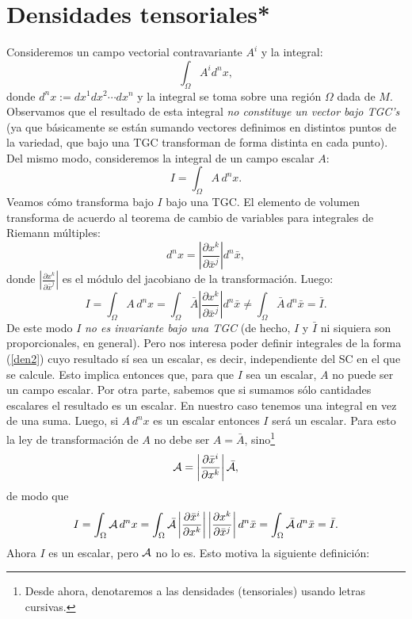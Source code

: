  \section{Densidades tensoriales*}

 Consideremos un campo vectorial contravariante $A^i $ y la integral:
 \begin{equation}
 \int_\Omega A^i d^nx, \label{den1}%
 \end{equation}
 donde $d^nx:=dx^1dx^2\cdots dx^n$ y la integral se toma sobre una
 región $\Omega$ dada de $M$. Observamos que el resultado de esta integral
 \textit{no constituye un vector bajo TGC's} (ya que básicamente se están
 sumando vectores definimos en distintos puntos de la variedad, que bajo una
 TGC transforman de forma distinta en cada punto). Del mismo modo,
 consideremos la integral de un campo escalar $A$:
 \begin{equation}
 I=\int_\Omega A\,d^nx. \label{den2}%
 \end{equation}
 Veamos cómo transforma bajo $I$ bajo una TGC. El elemento de volumen
 transforma de acuerdo al teorema de cambio de variables para integrales de
 Riemann múltiples:
 \begin{equation}
 d^nx=\left| \frac{\partial x^k}{\partial\bar{x}^j}\right| d^n
 \bar{x} ,
 \end{equation}
 donde $\left| \frac{\partial x^k}{\partial\bar{x}^j}\right|$ es el módulo
 del jacobiano de la transformación. Luego:
 \begin{equation}
 I=\int_\Omega A\,d^nx=\int_\Omega\bar{A}\left| \frac{\partial x^k
}{\partial\bar{x}^j %
}\right| d^n\bar{x}\neq\int_\Omega\bar{A}\,d^n\bar{x}=\bar{I}.
 \label{den3}%
 \end{equation}
 De este modo $I$ \textit{no es invariante bajo una TGC} (de hecho, $I$ y
 $\bar{I}$ ni siquiera son proporcionales, en general). Pero nos interesa poder
 definir integrales de la forma (\ref{den2}) cuyo resultado sí sea un
 escalar, es decir, independiente del SC en el que se calcule. Esto implica
 entonces que, para que $I$ sea un escalar, $A$ no puede ser un campo escalar.
 Por otra parte,
 sabemos que si sumamos sólo cantidades escalares el resultado es un escalar.
 En nuestro caso tenemos una integral en vez de una suma. Luego, si
 $A\,d^nx$ es
 un escalar entonces $I$ será un escalar. Para esto la ley de transformación
 de $A$ no debe ser $A=\bar{A}$, sino\footnote{Desde ahora, denotaremos a las
 densidades (tensoriales) usando letras cursivas.}
 \begin{equation}
 {\cal A}=\left| \frac{\partial\bar{x}^i}{\partial x^k}\right| \bar{{\cal
 A}},
 \label{den4}%
 \end{equation}
 de modo que
 \begin{equation}
 I=\int_\Omega {\cal A}\,d^nx=\int_\Omega\bar{{\cal A}}\left|
 \frac{\partial\bar{x}^i}{\partial x^k %
}\right| \left| \frac{\partial x^k}{\partial\bar{x}^j}\right|
 d^n\bar{x}
 =\int_\Omega\bar{{\cal A}}\,d^n\bar{x}=\bar{I}. \label{den5}%
 \end{equation}
 Ahora $I$ es un escalar, pero ${\cal A}$ no lo es. Esto motiva la siguiente
 definición:

